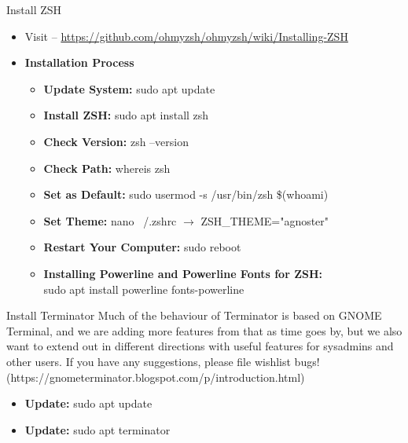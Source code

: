 \begin{frame}[t]{Install ZSH}
	\begin{itemize}
		\item Visit -- 
		\url{https://github.com/ohmyzsh/ohmyzsh/wiki/Installing-ZSH}
		\item \textbf{Installation Process } \\ 
		\begin{itemize}
			\item \textbf{Update System:} sudo apt update
			\item \textbf{Install ZSH:} sudo apt install zsh
			\item \textbf{Check Version:} zsh --version
			\item \textbf{Check Path:} whereis zsh
			\item \textbf{Set as Default:} sudo usermod -s /usr/bin/zsh 
			\$(whoami)
			\item \textbf{Set Theme:} nano ~/.zshrc $\rightarrow$ 
			ZSH\_THEME="agnoster"
			
			\item \textbf{Restart Your Computer:} sudo reboot 
			\item \textbf{Installing Powerline and Powerline Fonts for ZSH:} \\
			sudo apt install powerline fonts-powerline
		\end{itemize}
	\end{itemize}
\end{frame}

\begin{frame}[t]{Install Terminator}
	Much of the behaviour of Terminator is based on GNOME Terminal, and we are 
	adding more features from that as time goes by, but we also want to extend 
	out in different directions with useful features for sysadmins and other 
	users. If you have any suggestions, please file wishlist bugs! 
	(https://gnometerminator.blogspot.com/p/introduction.html)
	\begin{itemize}
		\item \textbf{Update:} sudo apt update 
		\item \textbf{Update:} sudo apt terminator  
	\end{itemize}
\end{frame}


